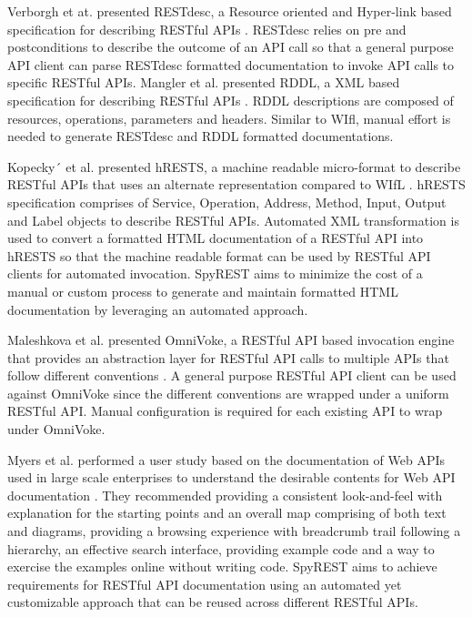 \documentclass[conference]{IEEEtran}
\begin{document}
Verborgh et at. presented RESTdesc, a Resource oriented and Hyper-link based specification for describing RESTful APIs \cite{Verborgh_functional}. RESTdesc relies on pre and postconditions to describe the outcome of an API call so that a general purpose API client can parse RESTdesc formatted documentation to invoke API calls to specific RESTful APIs. Mangler et al. presented RDDL, a XML based specification for describing RESTful APIs \cite{Mangler_rddl}. RDDL descriptions are composed of resources, operations, parameters and headers. Similar to WIfl, manual effort is needed to generate RESTdesc and RDDL formatted documentations.

Kopecky´ et al. presented hRESTS, a machine readable micro-format to describe RESTful APIs that uses an alternate representation compared to WIfL \cite{Kopecky_hrests}. hRESTS specification comprises of Service, Operation, Address, Method, Input, Output and Label objects to describe RESTful APIs. Automated XML transformation is used to convert a formatted HTML documentation of a RESTful API into hRESTS so that the machine readable format can be used by RESTful API clients for automated invocation. SpyREST aims to minimize the cost of a manual or custom process to generate and maintain formatted HTML documentation by leveraging an automated approach.

Maleshkova et al. presented OmniVoke, a RESTful API based invocation engine that provides an abstraction layer for RESTful API calls to multiple APIs that follow different conventions \cite{Maleshkova_omnivoke}. A general purpose RESTful API client can be used against OmniVoke since the different conventions are wrapped under a uniform RESTful API. Manual configuration is required for each existing API to wrap under OmniVoke.

Myers et al. performed a user study based on the documentation of Web APIs used in large scale enterprises to understand the desirable contents for Web API documentation \cite{Myers_study}. They recommended providing a consistent look-and-feel with explanation for the starting points and an overall map comprising of both text and diagrams, providing a browsing experience with breadcrumb trail following a hierarchy, an effective search interface, providing example code and a way to exercise the examples online without writing code. SpyREST aims to achieve requirements for RESTful API documentation using an automated yet customizable approach that can be reused across different RESTful APIs.
\end{document}
